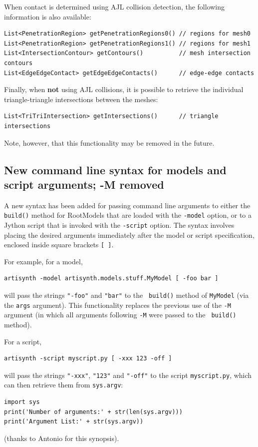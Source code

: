 \documentclass{article}
\begin{document}
When contact is determined using AJL collision detection, the
following information is also available:
%
\begin{lstlisting}[]
List<PenetrationRegion> getPenetrationRegions0() // regions for mesh0
List<PenetrationRegion> getPenetrationRegions1() // regions for mesh1
List<IntersectionContour> getContours()          // mesh intersection contours
List<EdgeEdgeContact> getEdgeEdgeContacts()      // edge-edge contacts
\end{lstlisting}
%

Finally, when {\bf not} using AJL collisions, it is possible to
retrieve the individual triangle-triangle intersections between the
meshes:
%
\begin{lstlisting}[]
List<TriTriIntersection> getIntersections()      // triangle intersections 
\end{lstlisting}
%
Note, however, that this functionality may be removed in the future.

\subsection*{New command line syntax for models and script arguments; -M removed}

A new syntax has been added for passing command line arguments to
either the {\tt build()} method for RootModels that are loaded with
the {\tt -model} option, or to a Jython script that is invoked with
the {\tt -script} option. The syntax involves placing the desired
arguments immediately after the model or script specification,
enclosed inside square brackets {\tt [ ]}.

For example, for a model,
\begin{verbatim}
artisynth -model artisynth.models.stuff.MyModel [ -foo bar ]
\end{verbatim}
will pass the strings {\tt "-foo"} and {\tt "bar"} to the {\tt
build()} method of {\tt MyModel} (via the {\tt args} argument).  This
functionality replaces the previous use of the {\tt -M} argument (in
which all arguments following {\tt -M} were passed to the {\tt
build()} method).

For a script,
\begin{verbatim}
artisynth -script myscript.py [ -xxx 123 -off ]
\end{verbatim}
will pass the strings {\tt "-xxx"}, {\tt "123"} and {\tt "-off"} to
the script {\tt myscript.py}, which can then retrieve them from
{\tt sys.argv}:
%
\begin{lstlisting}[]
import sys
print('Number of arguments:' + str(len(sys.argv)))
print('Argument List:' + str(sys.argv)) 
\end{lstlisting}
%
(thanks to Antonio for this synopsis).
\end{document}
